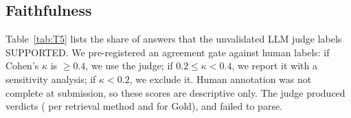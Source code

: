 \subsection{Faithfulness}
\label{sec:faith}
Table~\ref{tab:T5} lists the share of answers that the unvalidated LLM judge labels SUPPORTED.
We pre-registered an agreement gate against  human labels: if Cohen's $\kappa$ \citep{cohen1960} is $\geq 0.4$, we use the judge; if $0.2 \leq \kappa < 0.4$, we report it with a sensitivity analysis; if $\kappa < 0.2$, we exclude it.
Human annotation was not complete at submission, so these scores are descriptive only.
The judge produced  verdicts ( per retrieval method and  for Gold), and  failed to parse.
